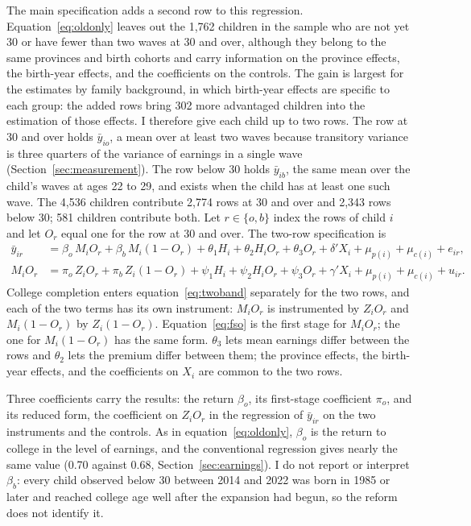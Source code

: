 \documentclass[11pt]{article}
\begin{document}
The main specification adds a second row to this regression. Equation~\eqref{eq:oldonly} leaves
out the 1,762 children in the sample who are not yet 30 or have fewer
than two waves at 30 and over, although they belong to the same
provinces and birth cohorts and carry information on the province effects, the birth-year effects, and the coefficients on the controls. The gain is largest for the estimates by family background, in which birth-year effects are specific to each group: the added rows bring 302 more advantaged children into the estimation of those effects. I therefore give each child up to two rows. The row at 30 and over holds $\bar y_{io}$, a mean over at least two waves because transitory variance is three quarters of the variance of
earnings in a single wave (Section~\ref{sec:measurement}). The row below 30 holds $\bar y_{ib}$, the
same mean over the child's waves at ages 22 to 29, and exists when the
child has at least one such wave. The 4,536 children contribute 2,774
rows at 30 and over and 2,343 rows below 30; 581 children contribute
both. Let $r \in \{o, b\}$ index the rows of child $i$ and let $O_r$
equal one for the row at 30 and over. The two-row specification is
\begin{align}
\bar y_{ir} &= \beta_o\, M_i O_r + \beta_b\, M_i (1 - O_r) + \theta_1 H_i
+ \theta_2 H_i O_r + \theta_3 O_r + \delta' X_i + \mu_{p(i)} + \mu_{c(i)} +
e_{ir}, \label{eq:twoband} \\
M_i O_r &= \pi_o\, Z_i O_r + \pi_{b}\, Z_i (1 - O_r) + \psi_1 H_i
+ \psi_2 H_i O_r + \psi_3 O_r + \gamma' X_i + \mu_{p(i)} + \mu_{c(i)} +
u_{ir}. \label{eq:fso}
\end{align}
College completion enters equation~\eqref{eq:twoband} separately for the two rows, and each of the two terms has its own instrument: $M_i O_r$ is instrumented by $Z_i O_r$ and $M_i (1 - O_r)$ by $Z_i (1 - O_r)$. Equation~\eqref{eq:fso} is the first stage for $M_i O_r$; the one for $M_i (1 - O_r)$ has the same form. $\theta_3$ lets mean earnings differ between
the rows and $\theta_2$ lets the premium differ between them; the province effects, the birth-year effects, and the coefficients on $X_i$ are common to the two rows.

Three coefficients carry the results: the return $\beta_o$, its first-stage coefficient $\pi_o$, and its reduced form, the coefficient on $Z_i O_r$ in the regression of $\bar y_{ir}$ on the two instruments and the controls. As in equation~\eqref{eq:oldonly}, $\beta_o$ is the return to college in the level of earnings, and the conventional regression gives nearly the same value (0.70 against 0.68, Section~\ref{sec:earnings}). I do not report or interpret $\beta_b$: every child observed below 30 between 2014 and 2022 was born in
1985 or later and reached college age well after the expansion had begun, so the reform does not identify it.
\end{document}
